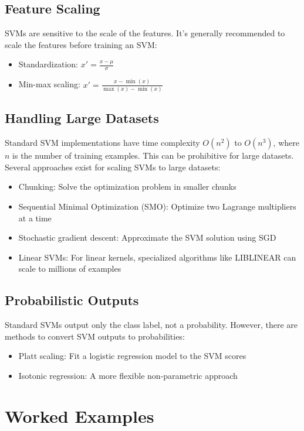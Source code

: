 \documentclass{article}
\begin{document}
\subsection{Feature Scaling}
SVMs are sensitive to the scale of the features. It's generally recommended to scale the features before training an SVM:
\begin{itemize}
    \item Standardization: $x' = \frac{x - \mu}{\sigma}$
    \item Min-max scaling: $x' = \frac{x - \min(x)}{\max(x) - \min(x)}$
\end{itemize}

\subsection{Handling Large Datasets}
Standard SVM implementations have time complexity $O(n^2)$ to $O(n^3)$, where $n$ is the number of training examples. This can be prohibitive for large datasets. Several approaches exist for scaling SVMs to large datasets:
\begin{itemize}
    \item Chunking: Solve the optimization problem in smaller chunks
    \item Sequential Minimal Optimization (SMO): Optimize two Lagrange multipliers at a time
    \item Stochastic gradient descent: Approximate the SVM solution using SGD
    \item Linear SVMs: For linear kernels, specialized algorithms like LIBLINEAR can scale to millions of examples
\end{itemize}

\subsection{Probabilistic Outputs}
Standard SVMs output only the class label, not a probability. However, there are methods to convert SVM outputs to probabilities:
\begin{itemize}
    \item Platt scaling: Fit a logistic regression model to the SVM scores
    \item Isotonic regression: A more flexible non-parametric approach
\end{itemize}

\section{Worked Examples}
\end{document}
